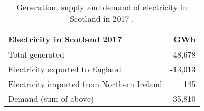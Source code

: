 \begin{table}[htbp]
	\caption{Generation, supply and demand of electricity in Scotland in 2017 \citep{BEIS2018ElecUK}.}
	\label{tbl:elec_demand}
	\centering
	\begin{tabular}{@{}lr@{}}
		\toprule
		Electricity in Scotland 2017 & GWh \\ \midrule
		Total generated & 48,678 \\
		Electricity exported to England & -13,013 \\
		Electricity imported from Northern Ireland & 145 \\ \midrule
		Demand (sum of above) & 35,810 \\ \bottomrule
	\end{tabular}
\end{table}
